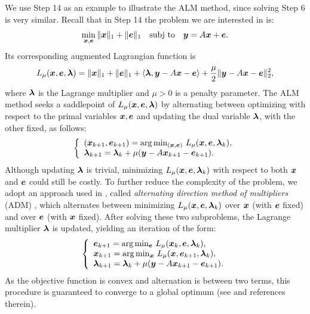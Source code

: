 \documentclass[10pt,journal,letterpaper,compsoc]{IEEEtran} %
\newcommand{\subj}{\textup{subj to}}
\begin{document}
We use Step 14 as an example to illustrate the ALM
method, since solving Step 6 is very similar. Recall that in
Step 14 the problem we are interested in is:
\begin{equation}
\min_{\x, \e} \| \x \|_1 + \|\e\|_1 \quad \subj \quad \y =
A \x + \e.
\end{equation}
Its corresponding augmented Lagrangian function is
\begin{equation}
L_\mu ({\boldsymbol{x}},\boldsymbol{e},\boldsymbol{\lambda}) = \|{\boldsymbol{x}}\|_1 + \|\boldsymbol{e}\|_1 + \langle \boldsymbol{\lambda}, {\boldsymbol{y}}-A{\boldsymbol{x}} - \boldsymbol{e} \rangle + \frac{\mu}{2} \|{\boldsymbol{y}} - A{\boldsymbol{x}} - \boldsymbol{e}\|_2^2,
\end{equation}
where $\boldsymbol{\lambda}$ is the Lagrange multiplier and $\mu > 0$ is a
penalty parameter. The ALM method seeks a saddlepoint of $L_\mu
({\boldsymbol{x}},\boldsymbol{e},\boldsymbol{\lambda})$ by alternating between optimizing with respect
to the primal variables ${\boldsymbol{x}}, \boldsymbol{e}$ and updating the dual variable
$\boldsymbol{\lambda}$, with the other fixed, as follows:
\begin{equation}
\left \{
\begin{array}{lll}
(\x_{k+1},\e_{k+1})  =  \arg\min_{(\x,\e)} \, L_{\mu} (\x,\e,\blamda_k),\\
\blamda_{k+1}  =  \blamda_k + \mu (\y - A\x_{k+1} - \e_{k+1}). \\
\end{array}
\right .
\label{eq:alm}
\end{equation}
Although updating $\boldsymbol{\lambda}$ is trivial,
minimizing $L_{\mu} ({\boldsymbol{x}},\boldsymbol{e},\boldsymbol{\lambda}_k)$ with respect to both
${\boldsymbol{x}}$ and $\boldsymbol{e}$ could still be costly. To further reduce the
complexity of the problem, we adopt an approach used in
\cite{YangJ2009-pp}, called \emph{alternating direction
method of multipliers} (ADM) \cite{Glowinski1975-TR}, which alternates between minimizing $L_{\mu} ({\boldsymbol{x}},\boldsymbol{e},\boldsymbol{\lambda}_k)$
over ${\boldsymbol{x}}$ (with $\boldsymbol{e}$ fixed) and over $\boldsymbol{e}$ (with ${\boldsymbol{x}}$ fixed). After solving these two subproblems, the Lagrange multiplier $\boldsymbol{\lambda}$ is updated, yielding an iteration of the form:
\begin{equation}
\left \{
\begin{array}{lll}
\e_{k+1}  =  \arg\min_{\e} \, L_{\mu} (\x_k,\e,\blamda_k),\\
\x_{k+1}  =  \arg\min_{\x} \, L_{\mu} (\x,\e_{k+1},\blamda_k),\\
\blamda_{k+1}  =  \blamda_k + \mu (\y - A\x_{k+1} - \e_{k+1}). \\
\end{array}
\right .
\label{eq:adm}
\end{equation}
As the objective function is convex and alternation is between two
terms, this procedure is guaranteed to converge to a global optimum (see \cite{YangJ2009-pp} and references therein).
\end{document}
